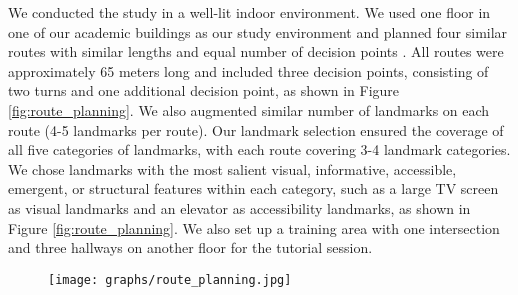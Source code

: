 We conducted the study in a well-lit indoor environment. We used one floor in one of our academic buildings as our study environment and planned four similar routes with similar lengths and equal number of decision points \cite{ishikawa2008wayfinding, may2020spotlights}. All routes were approximately 65 meters long and included three decision points, consisting of two turns and one additional decision point, as shown in Figure \ref{fig:route_planning}. We also augmented similar number of landmarks on each route (4-5 landmarks per route). Our landmark selection ensured the coverage of all five categories of landmarks, with each route covering 3-4 landmark categories. We chose landmarks with the most salient visual, informative, accessible, emergent, or structural features within each category, such as a large TV screen as visual landmarks and an elevator as accessibility landmarks, as shown in Figure \ref{fig:route_planning}. %
We also set up a training area with one intersection and three hallways on another floor for the tutorial session.

\begin{figure*}[ht]
    \centering
    \begin{subfigure}{\textwidth}
        \centering
        \texttt{[image: graphs/route\_planning.jpg]}
    \end{subfigure}
    \caption{Four routes in the study environment with labeled landmarks augmented in VisiMark, including both those along the routes and other landmarks in the space displayed on Signboards. Detailed landmarks and their types for each route are listed on the right.}
    \label{fig:route_planning}
\end{figure*}

